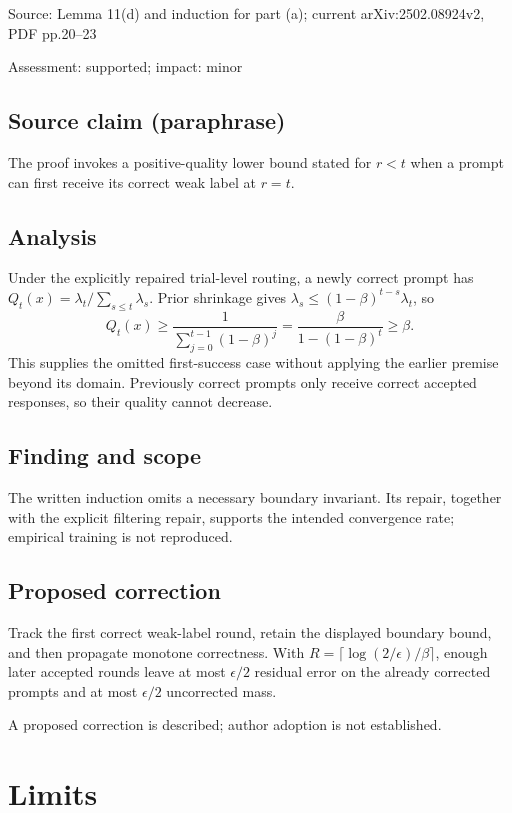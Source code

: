 \documentclass[11pt]{article}
\begin{document}
Source: Lemma 11(d) and induction for part (a); current arXiv:2502.08924v2, PDF pp.20–23

Assessment: supported; impact: minor

\subsection*{Source claim (paraphrase)}

The proof invokes a positive-quality lower bound stated for \(r<t\) when a prompt can first receive its correct weak label at \(r=t\).

\subsection*{Analysis}

Under the explicitly repaired trial-level routing, a newly correct prompt has \(Q_t(x)=\lambda_t/\sum_{s\le t}\lambda_s\). Prior shrinkage gives \(\lambda_s\le(1-\beta)^{t-s}\lambda_t\), so \[Q_t(x)\ge\frac{1}{\sum_{j=0}^{t-1}(1-\beta)^j}=\frac{\beta}{1-(1-\beta)^t}\ge\beta.\] This supplies the omitted first-success case without applying the earlier premise beyond its domain. Previously correct prompts only receive correct accepted responses, so their quality cannot decrease.

\subsection*{Finding and scope}

The written induction omits a necessary boundary invariant. Its repair, together with the explicit filtering repair, supports the intended convergence rate; empirical training is not reproduced.

\subsection*{Proposed correction}

Track the first correct weak-label round, retain the displayed boundary bound, and then propagate monotone correctness. With \(R=\lceil\log(2/\epsilon)/\beta\rceil\), enough later accepted rounds leave at most \(\epsilon/2\) residual error on the already corrected prompts and at most \(\epsilon/2\) uncorrected mass.

A proposed correction is described; author adoption is not established.

\section*{Limits}
\end{document}
